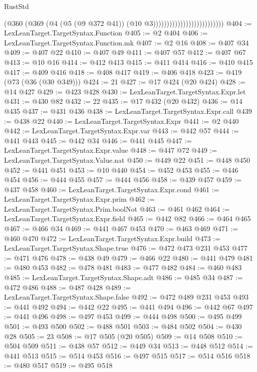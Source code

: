 \begin{lexlean}{RustStd}
\begin{coremodule}
{\begin{coremodule}
{{{{{{{{{{{{{{{{{{{{{{{{{                                                (@360
                                                  (@369
                                                    (@4
                                                      (@5 (@9 @372 @41))
                                                      (@10 @3))))))))))))))))))))))))))
@404 := LexLeanTarget.TargetSyntax.Function
@405 := @2 @404
@406 := LexLeanTarget.TargetSyntax.Function.mk
@407 := @2 @16
@408 := @407 @34
@409 := @407 @22
@410 := @407 @49
@411 := @407 @57
@412 := @407 @67
@413 := @10 @16
@414 := @412 @413
@415 := @411 @414
@416 := @410 @415
@417 := @409 @416
@418 := @408 @417
@419 := @406 @418
@423 := @419 (@73 (@36 (@30 @349)))
@424 := 21
@427 := @17 @424 (@20 @424)
@428 := @14 @427
@429 := @423 @428
@430 := LexLeanTarget.TargetSyntax.Expr.let
@431 := @430 @82
@432 := 22
@435 := @17 @432 (@20 @432)
@436 := @14 @435
@437 := @431 @436
@438 := LexLeanTarget.TargetSyntax.Expr.call
@439 := @438 @22
@440 := LexLeanTarget.TargetSyntax.Expr
@441 := @2 @440
@442 := LexLeanTarget.TargetSyntax.Expr.var
@443 := @442 @57
@444 := @441 @443
@445 := @442 @34
@446 := @441 @445
@447 := LexLeanTarget.TargetSyntax.Expr.value
@448 := @447 @72
@449 := LexLeanTarget.TargetSyntax.Value.nat
@450 := @449 @22
@451 := @448 @450
@452 := @441 @451
@453 := @10 @440
@454 := @452 @453
@455 := @446 @454
@456 := @444 @455
@457 := @444 @456
@458 := @439 @457
@459 := @437 @458
@460 := LexLeanTarget.TargetSyntax.Expr.cond
@461 := LexLeanTarget.TargetSyntax.Expr.prim
@462 := LexLeanTarget.TargetSyntax.Prim.boolNot
@463 := @461 @462
@464 := LexLeanTarget.TargetSyntax.Expr.field
@465 := @442 @82
@466 := @464 @465
@467 := @466 @34
@469 := @441 @467 @453
@470 := @463 @469
@471 := @460 @470
@472 := LexLeanTarget.TargetSyntax.Expr.build
@473 := LexLeanTarget.TargetSyntax.Shape.true
@476 := @472 @473 @231 @453
@477 := @471 @476
@478 := @438 @49
@479 := @466 @22
@480 := @441 @479
@481 := @480 @453
@482 := @478 @481
@483 := @477 @482
@484 := @460 @483
@485 := LexLeanTarget.TargetSyntax.Shape.adt
@486 := @485 @34
@487 := @472 @486
@488 := @487 @428
@489 := LexLeanTarget.TargetSyntax.Shape.false
@492 := @472 @489 @231 @453
@493 := @441 @492
@494 := @442 @22
@495 := @441 @494
@496 := @442 @67
@497 := @441 @496
@498 := @497 @453
@499 := @444 @498
@500 := @495 @499
@501 := @493 @500
@502 := @488 @501
@503 := @484 @502
@504 := @430 @28
@505 := 23
@508 := @17 @505 (@20 @505)
@509 := @14 @508
@510 := @504 @509
@511 := @438 @57
@512 := @449 @34
@513 := @448 @512
@514 := @441 @513
@515 := @514 @453
@516 := @497 @515
@517 := @514 @516
@518 := @480 @517
@519 := @495 @518
}}}}}}}}}}}}}}}}}}}}}}}}}
\end{coremodule}}
\end{coremodule}
\end{lexlean}

